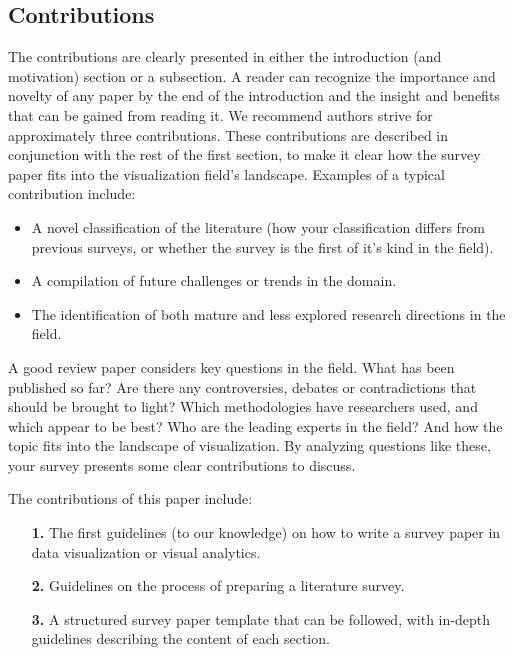 \subsection{Contributions}
The contributions are clearly presented in either the introduction (and motivation) section or a subsection. A reader can recognize the importance and novelty of any paper by the end of the introduction and the insight and benefits that can be gained from reading it. We recommend authors strive for approximately three contributions. These contributions are described in conjunction with the rest of the first section, to make it clear how the survey paper fits into the visualization field's landscape. Examples of a typical contribution include: 
\begin{itemize}
\item A novel classification of the literature (how your classification differs from previous surveys, or whether the survey is the first of it's kind in the field).
\item A compilation of future challenges or trends in the domain.
\item The identification of both mature and less explored research directions in the field.
\end{itemize}


A good review paper considers key questions in the field. What has been published so far? Are there any controversies, debates or contradictions that should be brought to light? Which methodologies have researchers used, and which appear to be best? Who are the leading experts in the field? And how the topic fits into the landscape of visualization. By analyzing questions like these, your survey presents some clear contributions to discuss.

The contributions of this paper include: 

\begin{itemize}[labelindent=0em, labelsep=0.2cm, leftmargin=*]
\item[\textbf{1.}] The first guidelines (to our knowledge) on how to write a survey paper in data visualization or visual analytics.
\item[\textbf{2.}] Guidelines on the process of preparing a literature survey.
\item[\textbf{3.}] A structured survey paper template that can be followed, with in-depth guidelines describing the content of each section.
\end{itemize}

